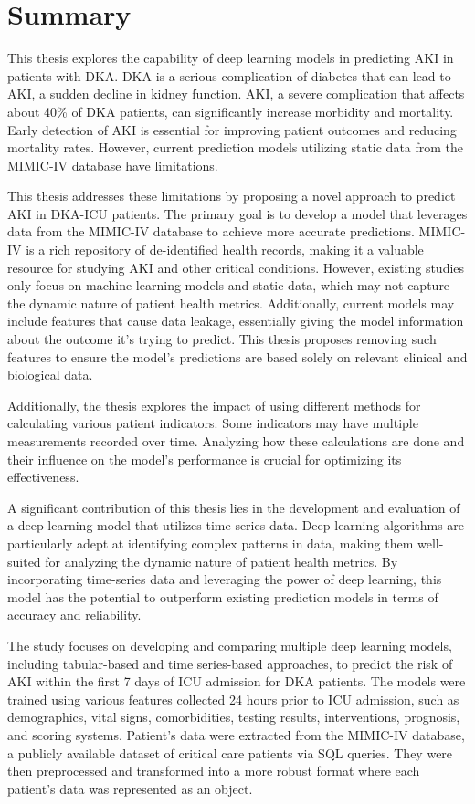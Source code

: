 \documentclass[../main.tex]{subfiles}
\begin{document}
\section{Summary}

This thesis explores the capability of deep learning models in predicting \gls{AKI} in patients with \gls{DKA}.
DKA is a serious complication of diabetes that can lead to AKI, a sudden decline in kidney function.
AKI, a severe complication that affects about 40\% of \gls{DKA} patients, can significantly increase morbidity and mortality.
Early detection of AKI is essential for improving patient outcomes and reducing mortality rates.
However, current prediction models utilizing static data from the MIMIC-IV database have limitations.

This thesis addresses these limitations by proposing a novel approach to predict AKI in DKA-ICU patients.
The primary goal is to develop a model that leverages data from the MIMIC-IV database to achieve more accurate predictions.
MIMIC-IV is a rich repository of de-identified health records, making it a valuable resource for studying AKI and other critical conditions.
However, existing studies only focus on machine learning models and static data, which may not capture the dynamic nature of patient health metrics.
Additionally, current models may include features that cause data leakage, essentially giving the model information about the outcome it's trying to predict.
This thesis proposes removing such features to ensure the model's predictions are based solely on relevant clinical and biological data.

Additionally, the thesis explores the impact of using different methods for calculating various patient indicators.
Some indicators may have multiple measurements recorded over time.
Analyzing how these calculations are done and their influence on the model's performance is crucial for optimizing its effectiveness.

A significant contribution of this thesis lies in the development and evaluation of a deep learning model that utilizes time-series data.
Deep learning algorithms are particularly adept at identifying complex patterns in data, making them well-suited for analyzing the dynamic nature of patient health metrics.
By incorporating time-series data and leveraging the power of deep learning, this model has the potential to outperform existing prediction models in terms of accuracy and reliability.

The study focuses on developing and comparing multiple deep learning models, including tabular-based and time series-based approaches, to predict the risk of \gls{AKI} within the first 7 days of \gls{ICU} admission for \gls{DKA} patients.
The models were trained using various features collected 24 hours prior to \gls{ICU} admission, such as demographics, vital signs, comorbidities, testing results, interventions, prognosis, and scoring systems.
Patient's data were extracted from the \gls{MIMIC-IV} database, a publicly available dataset of critical care patients via SQL queries.
They were then preprocessed and transformed into a more robust format where each patient's data was represented as an object.
\end{document}
